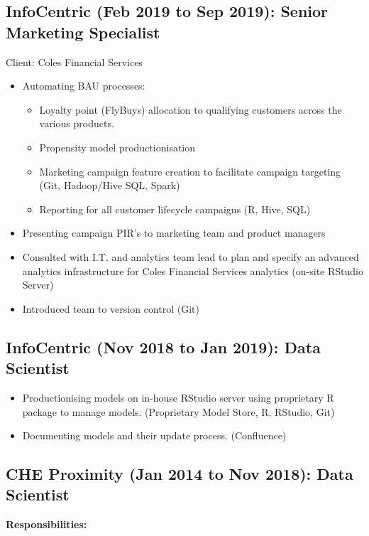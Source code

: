 \documentclass{article}
\begin{document}
\subsection{InfoCentric (Feb 2019 to Sep 2019): Senior Marketing Specialist}

Client: Coles Financial Services

\begin{itemize}
    \item Automating BAU processes:
        \begin{itemize}
            \item Loyalty point (FlyBuys) allocation to qualifying customers across the various products.
            \item Propensity model productionisation 
            \item Marketing campaign feature creation to facilitate campaign targeting (Git, Hadoop/Hive SQL, Spark)
            \item Reporting for all customer lifecycle campaigns (R, Hive, SQL)
        \end{itemize}
    \item Presenting campaign PIR’s to marketing team and product managers
    \item Consulted with I.T. and analytics team lead to plan and specify an advanced analytics infrastructure for Coles Financial Services analytics (on-site RStudio Server)
    \item Introduced team to version control (Git)
\end{itemize}

\subsection{InfoCentric (Nov 2018 to Jan 2019): Data Scientist}
\begin{itemize}
    \item Productionising models on in-house RStudio server using proprietary R package to manage models. (Proprietary Model Store, R, RStudio, Git)
    \item Documenting models and their update process. (Confluence)
\end{itemize}

\subsection{CHE Proximity (Jan 2014 to Nov 2018): Data Scientist}
\textbf{Responsibilities:}
\end{document}
